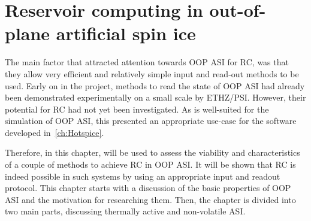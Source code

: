\chapter{Reservoir computing in out-of-plane artificial spin ice}\label{ch:Applications}

The main factor that attracted attention towards OOP ASI for RC, was that they allow very efficient and relatively simple input and read-out methods to be used.
Early on in the \spinengine project, methods to read the state of OOP ASI had already been demonstrated experimentally on a small scale by ETHZ/PSI.
However, their potential for RC had not yet been investigated.
As \hotspice is well-suited for the simulation of OOP ASI, this presented an appropriate use-case for the software developed in~\cref{ch:Hotspice}. \par %
Therefore, in this chapter, \hotspice will be used to assess the viability and characteristics of a couple of methods to achieve RC in OOP ASI.
It will be shown that RC is indeed possible in such systems by using an appropriate input and readout protocol.
This chapter starts with a discussion of the basic properties of OOP ASI and the motivation for researching them.
Then, the chapter is divided into two main parts, discussing thermally active and non-volatile ASI.

